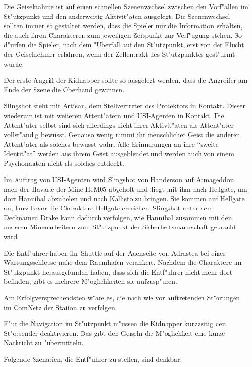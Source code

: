 \begin{remarks}
	Die Geiselnahme ist auf einen schnellen Szenenwechsel zwischen den Vorf"allen im St"utzpunkt und den anderweitig Aktivit"aten ausgelegt. Die Szenenwechsel sollten immer so gestaltet werden, dass die Spieler nur die Information erhalten, die auch ihren Charakteren zum jeweiligen Zeitpunkt zur Verf"ugung stehen. So d"urfen die Spieler, nach dem "Uberfall auf den St"utzpunkt, erst von der Flucht der Geiselnehmer erfahren, wenn der Zellentrakt des St"utzpunktes gest"urmt wurde.
	
	Der erste Angriff der Kidnapper sollte so ausgelegt werden, dass die Angreifer am Ende der Szene die Oberhand gewinnen.

	Slingshot steht mit Artisan, dem Stellvertreter des Protektors in Kontakt. Dieser wiederum ist mit weiteren Attent"atern und USI-Agenten in Kontakt. Die Attent"ater selbst sind sich allerdings nicht ihrer Aktivit"aten als Attent"ater vollst"andig bewusst. Genauso wenig nimmt ihr menschlicher Geist die anderen Attent"ater als solches bewusst wahr. Alle Erinnerungen an ihre "`zweite Identit"at"' werden aus ihrem Geist ausgeblendet und werden auch von einem Psychonauten nicht als solches entdeckt.
	
	Im Auftrag von USI-Agenten wird Slingshot von Handerson auf Armageddon nach der Havarie der Mine HeM05 abgeholt und fliegt mit ihm nach Hellgate, um dort Hannibal abzuholen und nach Kallisto zu bringen. Sie kommen auf Hellgate an, kurz bevor die Charaktere Hellgate erreichen. Slingshot unter dem Decknamen Drake kann dadurch verfolgen, wie Hannibal zusammen mit den anderen Minenarbeitern zum St"utzpunkt der Sicherheitsmannschaft gebracht wird.
\end{remarks}



Die Entf"uhrer haben ihr Shuttle auf der Au\3enseite von Adrastea bei einer Wartungsschleuse nahe dem Raumhafen verankert. Nachdem die Charaktere im St"utzpunkt herausgefunden haben, dass sich die Entf"uhrer nicht mehr dort befinden, gibt es mehrere M"oglichkeiten sie aufzusp"uren. 

Am Erfolgversprechendsten w"are es, die nach wie vor auftretenden St"orungen im ComNetz der Station zu verfolgen. 

F"ur die Navigation im St"utzpunkt m"ussen die Kidnapper kurzzeitig den St"orsender deaktivieren. Das gibt den Geiseln die M"oglichkeit eine kurze Nachricht zu "ubermitteln.

Folgende Szenarien, die Entf"uhrer zu stellen, sind denkbar:

